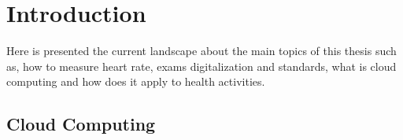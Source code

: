 
\chapter{Introduction}
Here is presented the current landscape about the main topics of this thesis such as, how to measure heart rate, exams digitalization and standards, what is cloud computing and how does it apply to health activities.
\section{Cloud Computing}
